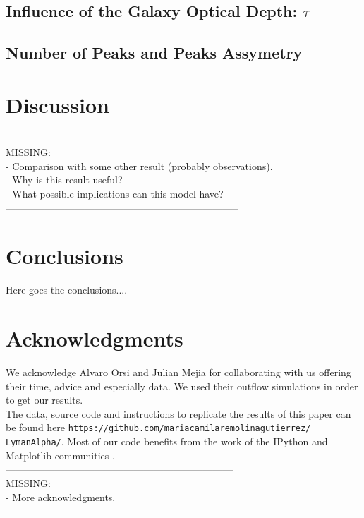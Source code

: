\documentclass{latex/emulateapj}
\begin{document}
\subsection{Influence of the Galaxy Optical Depth: $\tau$ }


\subsection{Number of Peaks and Peaks Assymetry}


\section{Discussion}
\label{sec:discussion}

---------------------------------------------------------------------\\
MISSING: \\
- Comparison with some other result (probably observations).\\
- Why is this result useful? \\
- What possible implications can this model have?\\
-----------------------------------------------------------------------\\

\section{Conclusions}
\label{sec:conclusions}
Here goes the conclusions....

\section*{Acknowledgments}

We acknowledge Alvaro Orsi and Julian Mejia for collaborating with us offering their time, advice and especially data. We used their outflow simulations in order to get our results.\\

The data, source code and instructions to replicate the results of this paper can be found here {\texttt{https://github.com/mariacamilaremolinagutierrez/ LymanAlpha/}}.
Most of our code benefits from the work of the IPython and Matplotlib communities \citep{IPython,matplotlib}.\\

---------------------------------------------------------------------\\
MISSING: \\
- More acknowledgments.\\
-----------------------------------------------------------------------\\
\end{document}
